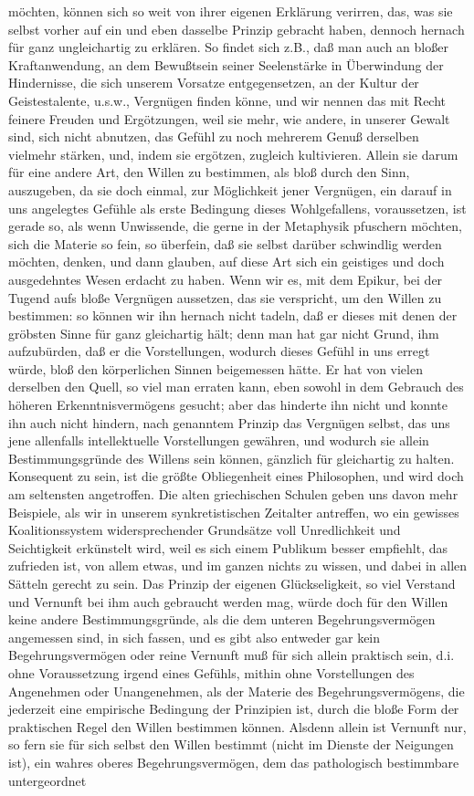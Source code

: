 \documentclass[a4paper,12pt,twoside]{book}
\begin{document}
möchten, können sich so weit von ihrer eigenen Erklärung verirren, das, was sie selbst vorher auf ein und eben dasselbe Prinzip gebracht haben, dennoch hernach für ganz ungleichartig zu erklären. So findet sich z.B., daß man auch an bloßer Kraftanwendung, an dem Bewußtsein seiner Seelenstärke in Überwindung der Hindernisse, die sich unserem Vorsatze entgegensetzen, an der Kultur der Geistestalente, u.s.w., Vergnügen finden könne, und wir nennen das mit Recht feinere Freuden und Ergötzungen, weil sie mehr, wie andere, in unserer Gewalt sind, sich nicht abnutzen, das Gefühl zu noch mehrerem Genuß derselben vielmehr stärken, und, indem sie ergötzen, zugleich kultivieren. Allein sie darum für eine andere Art, den Willen zu bestimmen, als bloß durch den Sinn, auszugeben, da sie doch einmal, zur Möglichkeit jener Vergnügen, ein darauf in uns angelegtes Gefühle als erste Bedingung dieses Wohlgefallens, voraussetzen, ist gerade so, als wenn Unwissende, die gerne in der Metaphysik pfuschern möchten, sich die Materie so fein, so überfein, daß sie selbst darüber schwindlig werden möchten, denken, und dann glauben, auf diese Art sich ein geistiges und doch ausgedehntes Wesen erdacht zu haben. Wenn wir es, mit dem Epikur, bei der Tugend aufs bloße Vergnügen aussetzen, das sie verspricht, um den Willen zu bestimmen: so können wir ihn hernach nicht tadeln, daß er dieses mit denen der gröbsten Sinne für ganz gleichartig hält; denn man hat gar nicht Grund, ihm aufzubürden, daß er die Vorstellungen, wodurch dieses Gefühl in uns erregt würde, bloß den körperlichen Sinnen beigemessen hätte. Er hat von vielen derselben  den Quell, so viel man erraten kann, eben sowohl in dem Gebrauch des höheren Erkenntnisvermögens gesucht; aber das hinderte ihn nicht und konnte ihn auch nicht hindern, nach genanntem Prinzip das Vergnügen selbst, das uns jene allenfalls intellektuelle Vorstellungen gewähren, und wodurch sie allein Bestimmungsgründe des Willens sein können, gänzlich für gleichartig zu halten. Konsequent zu sein, ist die größte Obliegenheit eines Philosophen, und wird doch am seltensten angetroffen. Die alten griechischen Schulen geben uns davon mehr Beispiele, als wir in unserem synkretistischen Zeitalter antreffen, wo ein gewisses Koalitionssystem widersprechender Grundsätze voll Unredlichkeit und Seichtigkeit erkünstelt wird, weil es sich einem Publikum besser empfiehlt, das zufrieden ist, von allem etwas, und im ganzen nichts zu wissen, und dabei in allen Sätteln gerecht zu sein. Das Prinzip der eigenen Glückseligkeit, so viel Verstand und Vernunft bei ihm auch gebraucht werden mag, würde doch für den Willen keine andere Bestimmungsgründe, als die dem unteren Begehrungsvermögen angemessen sind, in sich fassen, und es gibt also entweder gar kein Begehrungsvermögen oder reine Vernunft muß für sich allein praktisch sein, d.i. ohne Voraussetzung irgend eines Gefühls, mithin ohne Vorstellungen des Angenehmen oder Unangenehmen, als der Materie des Begehrungsvermögens, die jederzeit eine empirische Bedingung der Prinzipien ist, durch die bloße Form der praktischen Regel den Willen bestimmen können. Alsdenn allein ist Vernunft nur, so fern sie für sich selbst den Willen bestimmt (nicht im Dienste der Neigungen ist), ein wahres oberes Begehrungsvermögen, dem das pathologisch bestimmbare untergeordnet 
\end{document}
